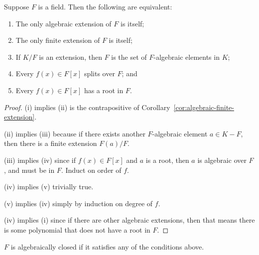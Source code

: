 \begin{lemma}\label{lem:splitting-field-properties}
    Suppose \(F\) is a field.
    Then the following are equivalent:
    \begin{enumerate}[label={(\roman*)}, itemsep=0mm]
        \item The only algebraic extension of \(F\) is itself;
        \item The only finite extension of \(F\) is itself;
        \item If \(K/F\) is an extension,
            then \(F\) is the set of \(F\)-algebraic elements in \(K\);
        \item Every \(f(x) \in F[x]\) splits over \(F\); and
        \item Every \(f(x) \in F[x]\) has a root in \(F\).
    \end{enumerate}
\end{lemma}
\begin{proof}
    (i) implies (ii) is the contrapositive of Corollary~\ref{cor:algebraic-finite-extension}.

    (ii) implies (iii) because if there exists another \(F\)-algebraic element \(a \in K-F\),
    then there is a finite extension \(F(a)/F\).

    (iii) implies (iv) since if \(f(x) \in F[x]\) and \(a\) is a root,
    then \(a\) is algebraic over \(F\), and must be in \(F\).
    Induct on order of \(f\).

    (iv) implies (v) trivially true.

    (v) implies (iv) simply by induction on degree of \(f\).

    (iv) implies (i) since if there are other algebraic extensions,
    then that means there is some polynomial that does not have a root in \(F\).
\end{proof}
\begin{definition}
    \(F\) is algebraically closed if it satisfies any of the conditions above.
\end{definition}

